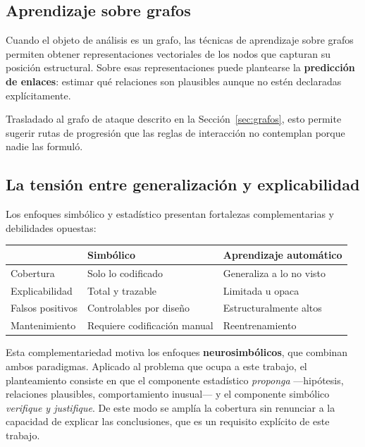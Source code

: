 \subsection{Aprendizaje sobre grafos}

Cuando el objeto de análisis es un grafo, las técnicas de aprendizaje sobre grafos permiten
obtener representaciones vectoriales de los nodos que capturan su posición estructural. Sobre
esas representaciones puede plantearse la \textbf{predicción de enlaces}: estimar qué
relaciones son plausibles aunque no estén declaradas explícitamente.

Trasladado al grafo de ataque descrito en la Sección~\ref{sec:grafos}, esto permite sugerir
rutas de progresión que las reglas de interacción no contemplan porque nadie las formuló.

\subsection{La tensión entre generalización y explicabilidad}

Los enfoques simbólico y estadístico presentan fortalezas complementarias y debilidades
opuestas:

\begin{center}
\begin{tabular}{@{}lll@{}}
\toprule
 & \textbf{Simbólico} & \textbf{Aprendizaje automático} \\
\midrule
Cobertura & Solo lo codificado & Generaliza a lo no visto \\
Explicabilidad & Total y trazable & Limitada u opaca \\
Falsos positivos & Controlables por diseño & Estructuralmente altos \\
Mantenimiento & Requiere codificación manual & Reentrenamiento \\
\bottomrule
\end{tabular}
\end{center}

Esta complementariedad motiva los enfoques \textbf{neurosimbólicos}, que combinan ambos
paradigmas. Aplicado al problema que ocupa a este trabajo, el planteamiento consiste en que
el componente estadístico \textit{proponga} —hipótesis, relaciones plausibles, comportamiento
inusual— y el componente simbólico \textit{verifique y justifique}. De este modo se amplía la
cobertura sin renunciar a la capacidad de explicar las conclusiones, que es un requisito
explícito de este trabajo.


